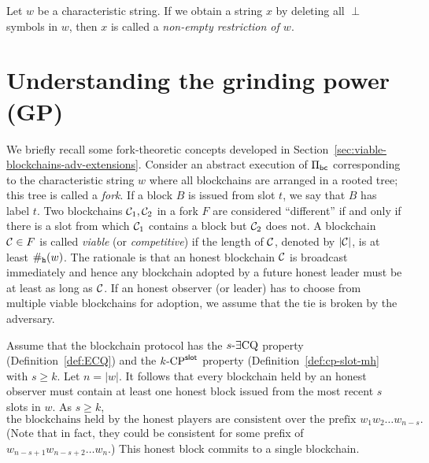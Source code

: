 Let $w$ be a characteristic string.
If we obtain a string $x$ by deleting all $\perp$ symbols in $w$, 
then $x$ is called a \emph{non-empty restriction of $w$}.







\section{Understanding the grinding power (GP)}

We briefly recall some fork-theoretic concepts
developed in Section~\ref{sec:viable-blockchains-adv-extensions}. 
Consider an abstract execution of $\Pi_\mathsf{bc}$ 
corresponding to the characteristic string $w$
where 
all blockchains are arranged in a rooted tree; 
this tree is called a \emph{fork}. 
If a block $B$ is issued from slot $t$, 
we say that $B$ has label $t$.
Two blockchains $\mathcal{C}_1, \mathcal{C}_2$ in a fork $F$ are considered ``different'' 
if and only if there is a slot from which 
$\mathcal{C}_1$ contains a block but $\mathcal{C}_2$ does not. 
A blockchain $\mathcal{C} \in F$ is called \emph{viable} (or \emph{competitive}) 
if the length of $\mathcal{C}$, denoted by $|\mathcal{C}|$, 
is at least $\#_{\mathtt{h}}(w)$. 
The rationale is that an honest blockchain $\mathcal{C}$ is broadcast immediately 
and hence any blockchain adopted by a future honest leader
must be at least as long as $\mathcal{C}$. 
If an honest observer (or leader) has to choose from multiple viable blockchains for adoption, 
we assume that the tie is broken by the adversary. 

Assume that the blockchain protocol 
has the ${s}\text{-}\exists\mathrm{CQ}$ property (Definition~\ref{def:ECQ}) 
and the ${k}\text{-}\mathrm{CP}^{\mathsf{slot}}$ property (Definition~\ref{def:cp-slot-mh} 
with $s \geq k$. 
Let $n = |w|$.
It follows that 
every blockchain held by an honest observer must contain 
at least one honest block 
issued from the most recent $s$ slots in $w$. 
As $s \geq k$, 
\begin{equation}
  \text{the blockchains held by the honest players 
    are consistent 
    over the prefix $w_1 w_2 \ldots w_{n-s}$.
  }
  \label{eq:last-honest-block-praos}
\end{equation}
(Note that in fact, they could be consistent for some prefix of $w_{n-s+1} w_{n-s+2} \ldots w_n$.)
This honest block commits to a single blockchain.

